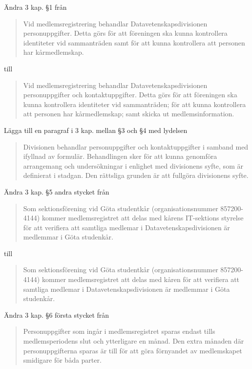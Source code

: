 \documentclass[protokoll]{dvd}
\begin{document}
\begin{beslut}
    \item Ändra 3 kap. §1 från

    \blockquote[][]{%
        Vid medlemsregistrering behandlar Datavetenskapsdivisionen personuppgifter.
        Detta görs för att föreningen ska kunna kontrollera identiteter vid sammanträden samt för att kunna kontrollera att personen har kårmedlemskap. 
    }

    till

    \blockquote[][]{%
        Vid medlemsregistrering behandlar Datavetenskapsdivisionen personuppgifter och kontaktuppgifter.
        Detta görs för att föreningen ska kunna kontrollera identiteter vid sammanträden; för att kunna kontrollera att personen har kårmedlemskap; samt skicka ut medlemsinformation.
    }

    \item Lägga till en paragraf i 3 kap. mellan §3 och §4 med lydelsen

    \blockquote[][]{%
        Divisionen behandlar personuppgifter och kontaktuppgifter i samband med ifyllnad av formulär.
        Behandlingen sker för att kunna genomföra arrangemang och undersökningar i enlighet med divisionens syfte, som är definierat i stadgan.
        Den rättsliga grunden är att fullgöra divisionens syfte.
    }

    \item Ändra 3 kap. §5 andra stycket från

    \blockquote[][]{%
        Som sektionsförening vid Göta studentkår (organisationsnummer 857200-4144) kommer medlemsregistret att delas med kårens IT-sektions styrelse för att verifiera att samtliga medlemar i Datavetenskapsdivisionen är medlemmar i Göta studenkår.
    }

    till

    \blockquote[][]{%
        Som sektionsförening vid Göta studentkår (organisationsnummer 857200-4144) kommer medlemsregistret att delas med kåren för att verifiera att samtliga medlemar i Datavetenskapsdivisionen är medlemmar i Göta studenkår.
    }

    \item Ändra 3 kap. §6 första stycket från

    \blockquote[][]{%
        Personuppgifter som ingår i medlemsregistret sparas endast tills medlemsperiodens slut och ytterligare en månad.
        Den extra månaden där personuppgifterna sparas är till för att göra förnyandet av medlemskapet smidigare för båda parter.
    }


\end{beslut}
\end{document}
